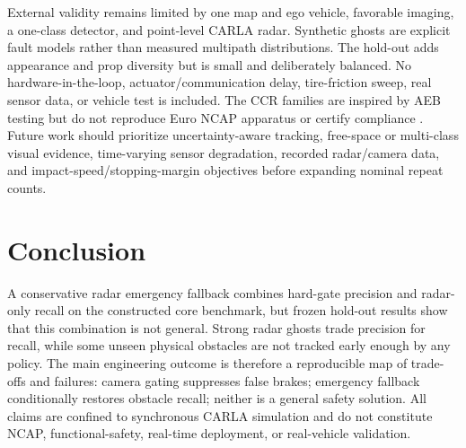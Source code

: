 \documentclass[conference]{IEEEtran}
\begin{document}
External validity remains limited by one map and ego vehicle, favorable imaging,
a one-class detector, and point-level CARLA radar. Synthetic ghosts are explicit
fault models rather than measured multipath distributions. The hold-out adds
appearance and prop diversity but is small and deliberately balanced. No
hardware-in-the-loop, actuator/communication delay, tire-friction sweep, real
sensor data, or vehicle test is included. The CCR families are inspired by AEB
testing but do not reproduce Euro NCAP apparatus or certify compliance
\cite{euroncap_aeb}. Future work should prioritize uncertainty-aware tracking,
free-space or multi-class visual evidence, time-varying sensor degradation,
recorded radar/camera data, and impact-speed/stopping-margin objectives before
expanding nominal repeat counts.

\section{Conclusion}
A conservative radar emergency fallback combines hard-gate precision and
radar-only recall on the constructed core benchmark, but frozen hold-out results
show that this combination is not general. Strong radar ghosts trade precision
for recall, while some unseen physical obstacles are not tracked early enough by
any policy. The main engineering outcome is therefore a reproducible map of
trade-offs and failures: camera gating suppresses false brakes; emergency
fallback conditionally restores obstacle recall; neither is a general safety
solution. All claims are confined to synchronous CARLA simulation and do not
constitute NCAP, functional-safety, real-time deployment, or real-vehicle
validation.

\balance


\end{document}
